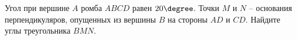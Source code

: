 \begin{ex}
	\begin{condition}
		Угол при вершине \( A \) ромба \( ABCD  \) равен \( 20\degree \). Точки \( M \)	и \( N \) – основания перпендикуляров, опущенных из вершины \( B \)	на стороны \( AD  \) и \( CD \). Найдите углы треугольника \( BMN  \).
	\end{condition}
\end{ex}